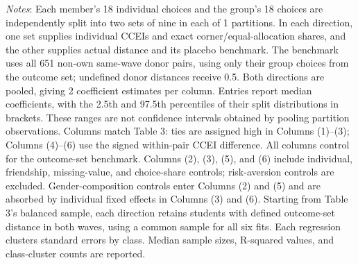 \par\vspace{6pt}\begin{minipage}{\textwidth}\footnotesize
\emph{Notes}: Each member's 18 individual choices and the group's 18 choices are independently split into two sets of nine in each of 1 partitions. In each direction, one set supplies individual CCEIs and exact corner/equal-allocation shares, and the other supplies actual distance and its placebo benchmark. The benchmark uses all 651 non-own same-wave donor pairs, using only their group choices from the outcome set; undefined donor distances receive 0.5. Both directions are pooled, giving 2 coefficient estimates per column. Entries report median coefficients, with the 2.5th and 97.5th percentiles of their split distributions in brackets. These ranges are not confidence intervals obtained by pooling partition observations. Columns match Table 3: ties are assigned high in Columns (1)--(3); Columns (4)--(6) use the signed within-pair CCEI difference. All columns control for the outcome-set benchmark. Columns (2), (3), (5), and (6) include individual, friendship, missing-value, and choice-share controls; risk-aversion controls are excluded. Gender-composition controls enter Columns (2) and (5) and are absorbed by individual fixed effects in Columns (3) and (6). Starting from Table 3's balanced sample, each direction retains students with defined outcome-set distance in both waves, using a common sample for all six fits. Each regression clusters standard errors by class. Median sample sizes, R-squared values, and class-cluster counts are reported.
\end{minipage}
